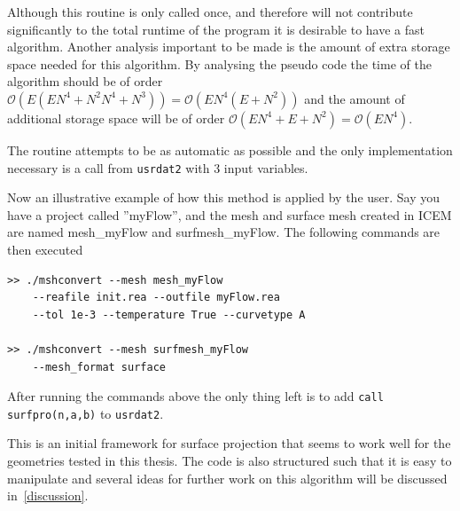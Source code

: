 Although this routine is only called once, and therefore will not contribute significantly 
to the total runtime of the program it is desirable to have a fast algorithm. Another analysis
important to be made is the amount of extra storage space needed for this algorithm.
By analysing the pseudo code the time of the algorithm should be of order $\mathcal{O}(E(EN^4+N^2N^4+N^3))=\mathcal{O}(EN^4(E+N^2))$
and the amount of additional storage space will be of order $\mathcal{O}(EN^4+E+N^2)=\mathcal{O}(EN^4)$.

The routine attempts to be as automatic as possible and the only implementation necessary is 
a call from \verb|usrdat2| with 3 input variables.

Now an illustrative example of how this method is applied by the user. Say you have a project
called ''myFlow'', and the mesh and surface mesh created in ICEM are named mesh\_myFlow and 
surfmesh\_myFlow. The following commands are then executed

%

% 
\begingroup
\fontsize{12pt}{14pt}
\begin{lstlisting}[escapechar=|,frame=none]
>> ./mshconvert --mesh mesh_myFlow 
    --reafile init.rea --outfile myFlow.rea
    --tol 1e-3 --temperature True --curvetype A

>> ./mshconvert --mesh surfmesh_myFlow 
    --mesh_format surface

\end{lstlisting}
\endgroup
After running the commands above the only thing left is to 
add \verb|call surfpro(n,a,b)| to \verb|usrdat2|.

This is an initial framework for surface projection that seems to work well for the geometries tested in this thesis.
The code is also structured such that it is easy to manipulate and several ideas for 
further work on this algorithm will be discussed in~\cref{discussion}.

% 
% 
